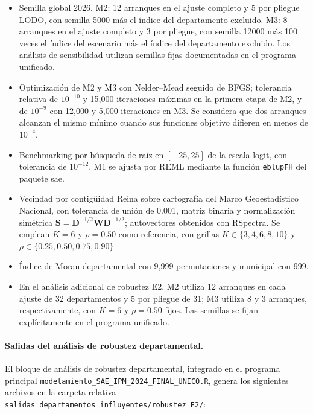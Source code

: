 \begin{itemize}
    \item Semilla global 2026. M2: 12 arranques en el ajuste completo y 5 por pliegue LODO, con semilla 5000 más el índice del departamento excluido. M3: 8 arranques en el ajuste completo y 3 por pliegue, con semilla 12000 más 100 veces el índice del escenario más el índice del departamento excluido. Los análisis de sensibilidad utilizan semillas fijas documentadas en el programa unificado.
    \item Optimización de M2 y M3 con Nelder--Mead seguido de BFGS; tolerancia relativa de $10^{-10}$ y 15{,}000 iteraciones máximas en la primera etapa de M2, y de $10^{-9}$ con 12{,}000 y 5{,}000 iteraciones en M3. Se considera que dos arranques alcanzan el mismo mínimo cuando sus funciones objetivo difieren en menos de $10^{-4}$.
    \item Benchmarking por búsqueda de raíz en $[-25,25]$ de la escala logit, con tolerancia de $10^{-12}$. M1 se ajusta por REML mediante la función \texttt{eblupFH} del paquete sae.
    \item Vecindad por contigüidad Reina sobre cartografía del Marco Geoestadístico Nacional, con tolerancia de unión de 0.001, matriz binaria y normalización simétrica $\mathbf{S}=\mathbf{D}^{-1/2}\mathbf{W}\mathbf{D}^{-1/2}$; autovectores obtenidos con RSpectra. Se emplean $K=6$ y $\rho=0.50$ como referencia, con grillas $K\in\{3,4,6,8,10\}$ y $\rho\in\{0.25,0.50,0.75,0.90\}$.
    \item Índice de Moran departamental con 9{,}999 permutaciones y municipal con 999.
    \item En el análisis adicional de robustez E2, M2 utiliza 12 arranques en cada ajuste de 32 departamentos y 5 por pliegue de 31; M3 utiliza 8 y 3 arranques, respectivamente, con $K=6$ y $\rho=0.50$ fijos. Las semillas se fijan explícitamente en el programa unificado.
\end{itemize}

\paragraph{Salidas del análisis de robustez departamental.}

El bloque de análisis de robustez departamental, integrado en el programa principal \texttt{modelamiento\_SAE\_IPM\_2024\_\allowbreak FINAL\_UNICO.R}, genera los siguientes archivos en la carpeta relativa \texttt{salidas\_departamentos\_influyentes/\allowbreak robustez\_E2/}:

